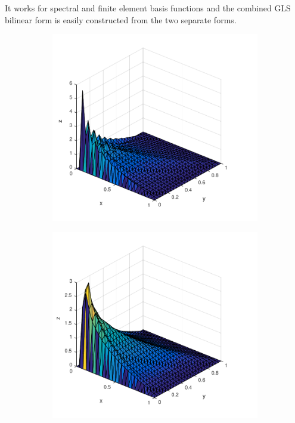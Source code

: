 It works for spectral and finite element basis functions and the combined GLS bilinear form is easily constructed from the two separate forms. 
%
\begin{figure}[h]
  \centering
  \begin{subfigure}[b]{0.48\textwidth}
	\includegraphics[width=\textwidth]{Figures/FEM_difftrans_aNeg.pdf}
  \end{subfigure}%
  \quad
  \begin{subfigure}[b]{0.48\textwidth}
	\includegraphics[width=\textwidth]{Figures/GLSFEM_difftrans_aNeg.pdf}

\end{subfigure}
\end{figure}
